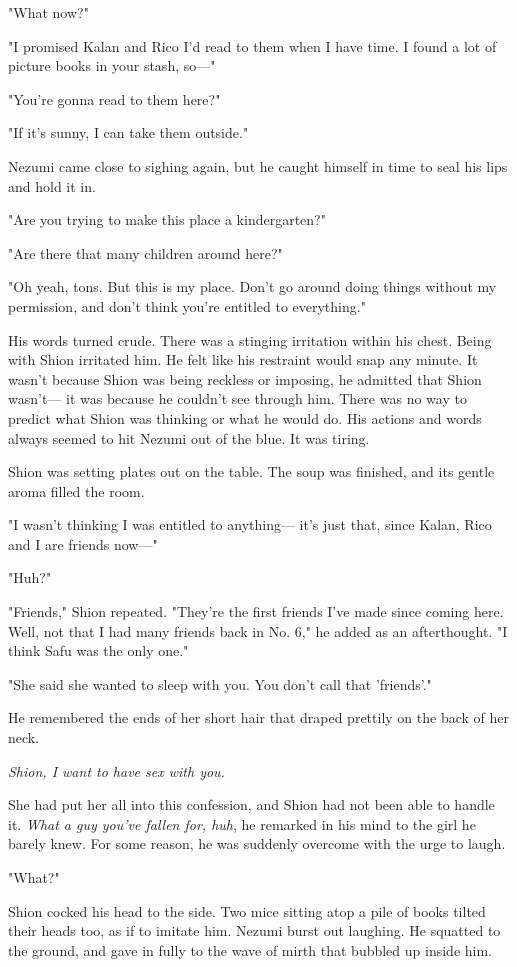 "What now?"

"I promised Kalan and Rico I'd read to them when I have time. I found a
lot of picture books in your stash, so---"

"You're gonna read to them here?"

"If it's sunny, I can take them outside."

Nezumi came close to sighing again, but he caught himself in time to
seal his lips and hold it in.

"Are you trying to make this place a kindergarten?"

"Are there that many children around here?"

"Oh yeah, tons. But this is my place. Don't go around doing things
without my permission, and don't think you're entitled to everything."

His words turned crude. There was a stinging irritation within his
chest. Being with Shion irritated him. He felt like his restraint would
snap any minute. It wasn't because Shion was being reckless or imposing,
he admitted that Shion wasn't--- it was because he couldn't see through
him. There was no way to predict what Shion was thinking or what he
would do. His actions and words always seemed to hit Nezumi out of the
blue. It was tiring.

Shion was setting plates out on the table. The soup was finished, and
its gentle aroma filled the room.

"I wasn't thinking I was entitled to anything--- it's just that, since
Kalan, Rico and I are friends now---"

"Huh?"

"Friends," Shion repeated. "They're the first friends I've made since
coming here. Well, not that I had many friends back in No. 6," he added
as an afterthought. "I think Safu was the only one."

"She said she wanted to sleep with you. You don't call that 'friends'."

He remembered the ends of her short hair that draped prettily on the
back of her neck.

\emph{Shion, I want to have sex with you.}

She had put her all into this confession, and Shion had not been able to
handle it. \emph{What a guy you've fallen for, huh}, he remarked in his mind to
the girl he barely knew. For some reason, he was suddenly overcome with
the urge to laugh.

"What?"

Shion cocked his head to the side. Two mice sitting atop a pile of books
tilted their heads too, as if to imitate him. Nezumi burst out laughing.
He squatted to the ground, and gave in fully to the wave of mirth that
bubbled up inside him.

